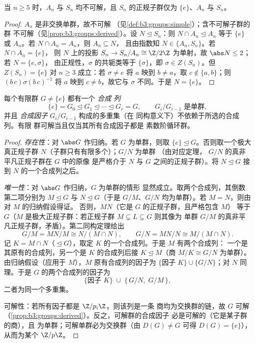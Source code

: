 \begin{corollary}\label{cor:b3:groups:snnotsolvable}
当 $n \geq 5$ 时，$A_n$ 与 $S_n$ 均不可解，且
$S_n$ 的正规子群仅为 $\{e\}$、$A_n$ 与 $S_n$。
\end{corollary}

\begin{proof}
$A_n$ 是非交换单群，故不可解
（见\cref{def:b3:groups:simple}）；含不可解子群的群
不可解（见\cref{prop:b3:groups:derived}）。设 $N
\trianglelefteq S_n$：则 $N \cap A_n \trianglelefteq A_n$ 等于
$\{e\}$ 或 $A_n$。若 $N \cap A_n = A_n$，则 $A_n \subseteq N$，
且由指数知 $N \in \{A_n, S_n\}$。若 $N \cap A_n = \{e\}$，
则 $N$ 上的投影 $S_n \to S_n/A_n \cong
\Z/2\Z$ 为单射，故 $\abs N \leq 2$；若 $N = \{e, \sigma\}$，
由正规性，$\sigma$ 的共轭类等于
$\{\sigma\}$，即 $\sigma \in Z(S_n)$。但 $Z(S_n) = \{e\}$ 对
$n \geq 3$ 成立：若 $\sigma \ne e$ 将 $a$ 映到 $b \neq a$，取 $c
\notin \{a, b\}$；则 $(b\,c)\sigma(b\,c)^{-1}$ 将 $a$ 映到 $c
\ne b$，故它与 $\sigma$ 不同。于是 $N = \{e\}$。
\end{proof}

\begin{theorem}\label{thm:b3:groups:jordanholder}
每个有限群 $G \neq \{e\}$ 都有一个 \emph{合成
列}
\[
\{e\} = G_0 \trianglelefteq G_1 \trianglelefteq \cdots
\trianglelefteq G_r = G,
\qquad G_{i}/G_{i-1} \text{ 是单群},
\]
并且 \emph{合成因子} $G_i/G_{i-1}$ 构成的多重集（在
同构意义下）不依赖于所选的合成列。有限
群可解当且仅当其所有合成因子都是
素数阶循环群。
\end{theorem}

\begin{proof}
\emph{存在性}：对 $\abs G$ 作归纳。若 $G$ 为单群，则取
$\{e\} \trianglelefteq G$。否则取一个极大真正规子群
$N$（子群只有有限多个）；$G/N$ 为单群
（由对应定理，
$G/N$ 的真非平凡正规子群在 $G$ 中的原像
是严格介于 $N$ 与 $G$ 之间的正规子群）。将 $N \trianglelefteq G$ 接到
$N$ 的一个合成列之后。

\emph{唯一性}：对 $\abs G$ 作归纳，$G$ 为单群的情形
显然成立。取两个合成列，其倒数第二项分别为
$M \trianglelefteq G$ 与 $N \trianglelefteq G$（于是 $G/M$、$G/N$
均为单群）。若 $M = N$，则由对 $M$ 的归纳假设得证。
否则，$MN$（它是 $G$ 的正规子群，且严格包含 $M$）
等于 $G$（$M$ 是极大正规子群：若正规子群 $M \subsetneq L
\subsetneq G$ 则其像为
单群 $G/M$ 的真非平凡正规子群，矛盾）。第二同构定理给出
\[
G/M = MN/M \cong N/(M \cap N),
\qquad
G/N = MN/N \cong M/(M \cap N).
\]
记 $K = M \cap N$（$\trianglelefteq G$），取定
$K$ 的一个合成列。于是 $M$ 有两个合成列：
一个是其原有的合成列，另一个是 $K$ 的合成列后接 $K \trianglelefteq
M$（商 $M/K \cong G/N$ 为单群）。由归纳假设（应用于
$M$），$M$ 原有合成列的因子为
$\{\text{因子 } K\} \cup \{G/N\}$；对 $N$ 同理。于是
$G$ 的两个合成列的因子为
\[
\{\text{因子 } K\} \;\cup\; \{\,G/N,\; G/M\,\},
\]
二者为同一个多重集。

可解性：若所有因子都是 $\Z/p_i\Z$，则该列是一条
商均为交换群的链，故 $G$ 可解
（\cref{prop:b3:groups:derived}）。反之，可解群的合成因子
必是可解的（它是某子群的商），且
为单群；可解单群必为交换群（由 $D(G) \ne G$ 可得
$D(G) = \{e\}$），从而为某个 $\Z/p\Z$。
\end{proof}

